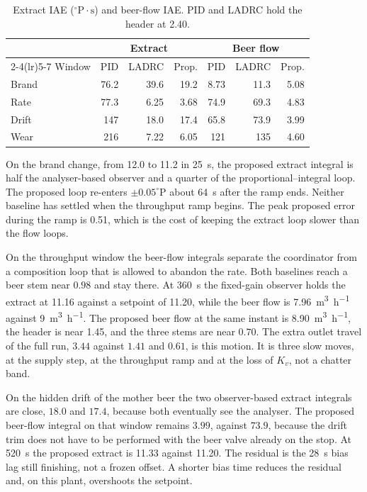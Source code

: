 \documentclass[conference,a4paper]{IEEEtran}
\newcommand{\degP}{^{\circ}\mathrm{P}}
\begin{document}
\begin{table}[!t]
\caption{Extract IAE ($\degP\cdot\mathrm{s}$) and beer-flow IAE. PID and LADRC hold the header at \SI{2.40}{\barg}.}
\label{tab:win}
\centering
\footnotesize
\begin{tabular}{@{}lrrrrrr@{}}
\toprule
 & \multicolumn{3}{c}{Extract} & \multicolumn{3}{c}{Beer flow} \\
\cmidrule(lr){2-4}\cmidrule(lr){5-7}
Window & PID & LADRC & Prop. & PID & LADRC & Prop. \\
\midrule
Brand & 76.2 & 39.6 & 19.2 & 8.73 & 11.3 & 5.08 \\
Rate & 77.3 & 6.25 & 3.68 & 74.9 & 69.3 & 4.83 \\
Drift & 147 & 18.0 & 17.4 & 65.8 & 73.9 & 3.99 \\
Wear & 216 & 7.22 & 6.05 & 121 & 135 & 4.60 \\
\bottomrule
\end{tabular}
\end{table}

On the brand change, from \SI{12.0}{\plato} to \SI{11.2}{\plato} in \SI{25}{s}, the proposed extract integral is half the analyser-based observer and a quarter of the proportional--integral loop. The proposed loop re-enters $\pm 0.05\degP$ about \SI{64}{s} after the ramp ends. Neither baseline has settled when the throughput ramp begins. The peak proposed error during the ramp is \SI{0.51}{\plato}, which is the cost of keeping the extract loop slower than the flow loops.

On the throughput window the beer-flow integrals separate the coordinator from a composition loop that is allowed to abandon the rate. Both baselines reach a beer stem near $0.98$ and stay there. At \SI{360}{s} the fixed-gain observer holds the extract at \SI{11.16}{\plato} against a setpoint of \SI{11.20}{\plato}, while the beer flow is \SI{7.96}{\cubic\metre\per\hour} against \SI{9}{\cubic\metre\per\hour}. The proposed beer flow at the same instant is \SI{8.90}{\cubic\metre\per\hour}, the header is near \SI{1.45}{\barg}, and the three stems are near $0.70$. The extra outlet travel of the full run, $3.44$ against $1.41$ and $0.61$, is this motion. It is three slow moves, at the supply step, at the throughput ramp and at the loss of $K_v$, not a chatter band.

On the hidden drift of the mother beer the two observer-based extract integrals are close, $18.0$ and $17.4$, because both eventually see the analyser. The proposed beer-flow integral on that window remains $3.99$, against $73.9$, because the drift trim does not have to be performed with the beer valve already on the stop. At \SI{520}{s} the proposed extract is \SI{11.33}{\plato} against \SI{11.20}{\plato}. The residual is the \SI{28}{s} bias lag still finishing, not a frozen offset. A shorter bias time reduces the residual and, on this plant, overshoots the setpoint.
\end{document}
